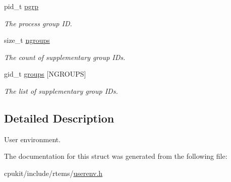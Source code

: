 \begin{DoxyCompactItemize}
pid\+\_\+t \mbox{\hyperlink{structrtems__user__env__t_a738ba9caf701faf094dd4653a1a574a9}{pgrp}}
\begin{DoxyCompactList}\small\item\em The process group ID. \end{DoxyCompactList}\item 
\mbox{\label{structrtems__user__env__t_a19d7518e6869edf6d69ea59608c80c20}} 
size\+\_\+t \mbox{\hyperlink{structrtems__user__env__t_a19d7518e6869edf6d69ea59608c80c20}{ngroups}}
\begin{DoxyCompactList}\small\item\em The count of supplementary group I\+Ds. \end{DoxyCompactList}\item 
\mbox{\label{structrtems__user__env__t_a7e14eb32c5ff4ac7d540936437d57c42}} 
gid\+\_\+t \mbox{\hyperlink{structrtems__user__env__t_a7e14eb32c5ff4ac7d540936437d57c42}{groups}} \mbox{[}N\+G\+R\+O\+U\+PS\mbox{]}
\begin{DoxyCompactList}\small\item\em The list of supplementary group I\+Ds. \end{DoxyCompactList}\end{DoxyCompactItemize}


\subsection{Detailed Description}
User environment. 

The documentation for this struct was generated from the following file\+:\begin{DoxyCompactItemize}
\item 
cpukit/include/rtems/\mbox{\hyperlink{userenv_8h}{userenv.\+h}}\end{DoxyCompactItemize}
